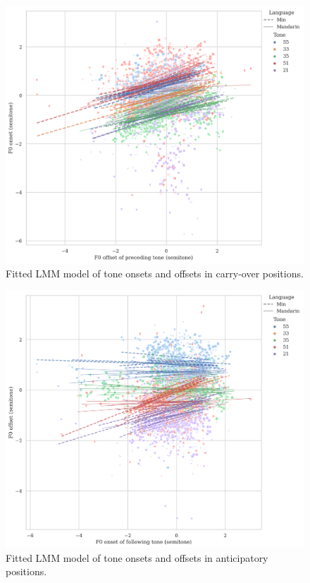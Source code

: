 \documentclass[12pt]{report}
\begin{document}
\begin{CJK}{UTF8}{bsmi}
\begin{figure}[hbt!]
\centering
\includegraphics[scale=.45, trim={0 .5cm 0 0}]{Figures/E1/Carryover.png}
\caption{Fitted LMM model of tone onsets and offsets in carry-over positions.}
\label{Figure:LMMCarryover}
\end{figure}

\begin{figure}[hbt!]
\centering
\includegraphics[scale=.45, trim={0 .5cm 0 0}]{Figures/E1/Anticipatory.png}
\caption{Fitted LMM model of tone onsets and offsets in anticipatory positions.}
\label{Figure:LMMAnticipatory}
\end{figure}


\end{CJK}
\end{document}
